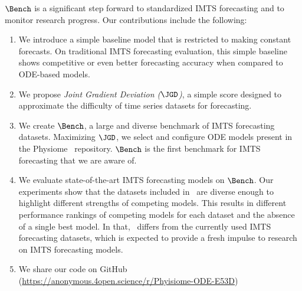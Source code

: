 $\Bench$ is a significant step forward to standardized IMTS forecasting and to
monitor research progress.
Our contributions include the following:
\begin{enumerate}
\item We introduce a simple baseline model that is restricted to making
constant forecasts. On traditional IMTS forecasting
evaluation, this simple
baseline shows competitive or even better forecasting accuracy
when compared to ODE-based models.
\item We propose  \emph{Joint Gradient Deviation ($\JGD$)}, a simple score
designed to approximate the difficulty of
time series datasets for forecasting.
\item We create $\Bench$, a large and diverse benchmark of IMTS forecasting datasets.
Maximizing $\JGD$, we select and configure ODE models present in the Physiome~\citep{Yu2011.Physiome} repository.
$\Bench$ is the first benchmark for IMTS forecasting that we are aware of.
\item We evaluate state-of-the-art IMTS forecasting models on $\Bench$. 
Our experiments show that the datasets included in \Bench~are diverse enough to highlight different strengths of competing models. 
This results in different performance rankings of competing models for each dataset and the absence of a single best model. 
In that, \Bench~differs from the currently used IMTS forecasting datasets, which is expected to provide a fresh impulse to research
on IMTS forecasting models.
\item We share our code on GitHub (\url{https://anonymous.4open.science/r/Phyisiome-ODE-E53D})
\end{enumerate}


